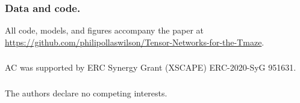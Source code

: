 \documentclass[runningheads]{llncs}
\begin{document}
\begin{credits}
\subsubsection{Data and code.} All code, models, and figures accompany the paper at
\url{https://github.com/philipollaswilson/Tensor-Networks-for-the-Tmaze}.
\subsubsection{\ackname} AC was supported by ERC Synergy Grant (XSCAPE)
ERC-2020-SyG 951631.
\subsubsection{\discintname} The authors declare no competing interests.
\end{credits}
\end{document}
